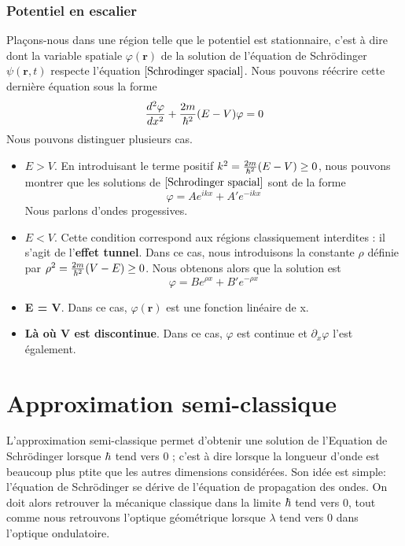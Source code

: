 \documentclass[../notesdecours]{subfiles}
\begin{document}
\subsubsection{Potentiel en escalier}
Plaçons-nous dans une région telle que le potentiel est stationnaire, c'est à dire dont la variable spatiale $\varphi (\bm{r})$ de la solution de l'équation de Schrödinger $\psi (\bm{r},t)$ respecte l'équation $\eqref{Schrodinger spacial}$. Nous pouvons réécrire cette dernière équation sous la forme
\begin{equation*}
\frac{d^2 \varphi}{dx^2} + \frac{2m}{\hbar^2} (E-V)\varphi = 0
\end{equation*}
Nous pouvons distinguer plusieurs cas.
\begin{itemize}
\item \textbf{$E > V$}. En introduisant le terme positif $k^2 = \frac{2m}{\hbar^2} (E-V) \geq 0$, nous pouvons montrer que les solutions de $\eqref{Schrodinger spacial}$ sont de la forme
\begin{equation}
\varphi = Ae^{ikx} + A'e^{-ikx}
\end{equation}
Nous parlons d'ondes progessives.
\item \textbf{$E < V$}. Cette condition correspond aux régions classiquement interdites : il s'agit de l'\textbf{effet tunnel}. Dans ce cas, nous introduisons la constante $\rho$ définie par $\rho^2 = \frac{2m}{\hbar^2} (V-E) \geq 0$. Nous obtenons alors que la solution est
\begin{equation}
\varphi = Be^{\rho x} + B' e^{-\rho x}
\end{equation}
\item \textbf{E = V}. Dans ce cas, $\varphi (\bm{r})$ est une fonction linéaire de x.
\item \textbf{Là où V est discontinue}. Dans ce cas, $\varphi$ est continue et $\partial_x\varphi$ l'est également.
\end{itemize}
\section{Approximation semi-classique}
L'approximation semi-classique permet d'obtenir une solution de l'Equation de Schrödinger lorsque $\hbar$ tend vers 0 ; c'est à dire lorsque la longueur d'onde est beaucoup plus ptite que les autres dimensions considérées. Son idée est simple: l'équation de Schrödinger se dérive de l'équation de propagation des ondes. On doit alors retrouver la mécanique classique dans la limite $\hbar$ tend vers 0, tout comme nous retrouvons l'optique géométrique lorsque $\lambda$ tend vers 0 dans l'optique ondulatoire.\\
\end{document}
